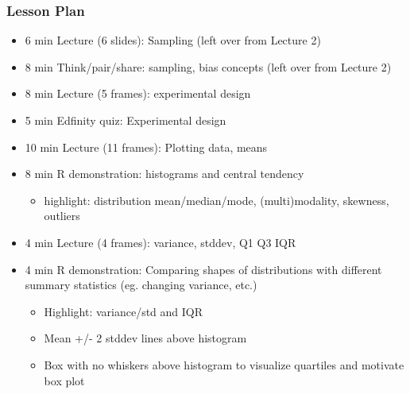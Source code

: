 \begin{frame}
    \frametitle{Lesson Plan}
    \begin{itemize}
        \item 6 min Lecture (6 slides): Sampling (left over from Lecture 2)
        \item 8 min Think/pair/share: sampling, bias concepts (left over from Lecture 2)
        \item 8 min Lecture (5 frames): experimental design
        \item 5 min Edfinity quiz: Experimental design
        \item 10 min Lecture (11 frames): Plotting data, means
        \item 8 min R demonstration: histograms and central tendency
        \begin{itemize}
            \item  highlight: distribution mean/median/mode, (multi)modality, skewness, outliers
        \end{itemize}

        \item 4 min Lecture (4 frames): variance, stddev, Q1 Q3 IQR
        \item 4 min R demonstration: Comparing shapes of distributions with different summary statistics (eg. changing variance, etc.)
        \begin{itemize}
            \item Highlight: variance/std and IQR
            \item Mean +/- 2 stddev lines above histogram
            \item Box with no whiskers above histogram to visualize quartiles and motivate box plot
         \end{itemize}
     \end{itemize}
\end{frame}

